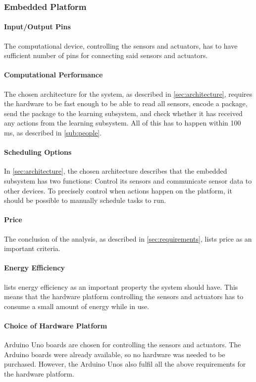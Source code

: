 \subsubsection{Embedded Platform}
\paragraph{Input/Output Pins}
The computational device, controlling the sensors and actuators, has to have sufficient number of pins for connecting said sensors and actuators.

\paragraph{Computational Performance}
The chosen architecture for the system, as described in \cref{sec:architecture}, requires the hardware to be fast enough to be able to read all sensors, encode a package, send the package to the learning subsystem, and check whether it has received any actions from the learning subsystem. All of this has to happen within 100 ms, as described in \cref{sub:people}.

\paragraph{Scheduling Options}
In \cref{sec:architecture}, the chosen architecture describes that the embedded subsystem has two functions: Control its sensors and communicate sensor data to other devices. To precisely control when actions happen on the platform, it should be possible to manually schedule tasks to run.

\paragraph{Price}
The conclusion of the analysis, as described in \cref{sec:requirements}, lists price as an important criteria.

\paragraph{Energy Efficiency}
 lists energy efficiency as an important property the system should have. This means that the hardware platform controlling the sensors and actuators has to consume a small amount of energy while in use.

\paragraph{Choice of Hardware Platform}
Arduino Uno boards are chosen for controlling the sensors and actuators. The Arduino boards were already available, so no hardware was needed to be purchased. However, the Arduino Unos also fulfil all the above requirements for the hardware platform.

